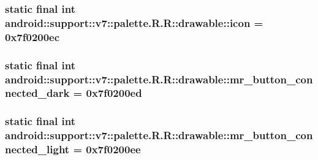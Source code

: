 \hypertarget{classandroid_1_1support_1_1v7_1_1palette_1_1_r_1_1drawable_890458ca42f2f744b6dbf29ebc882c73}{
\subsubsection[{icon}]{\setlength{\rightskip}{0pt plus 5cm}static final int android::support::v7::palette.R.R::drawable::icon = 0x7f0200ec}}
\label{classandroid_1_1support_1_1v7_1_1palette_1_1_r_1_1drawable_890458ca42f2f744b6dbf29ebc882c73}


\hypertarget{classandroid_1_1support_1_1v7_1_1palette_1_1_r_1_1drawable_00cded799af201976188bba8c1bc1765}{
\subsubsection[{mr\_\-button\_\-connected\_\-dark}]{\setlength{\rightskip}{0pt plus 5cm}static final int android::support::v7::palette.R.R::drawable::mr\_\-button\_\-connected\_\-dark = 0x7f0200ed}}
\label{classandroid_1_1support_1_1v7_1_1palette_1_1_r_1_1drawable_00cded799af201976188bba8c1bc1765}


\hypertarget{classandroid_1_1support_1_1v7_1_1palette_1_1_r_1_1drawable_e7dc655c3e1d3de8f872b28a5e97e0cb}{
\subsubsection[{mr\_\-button\_\-connected\_\-light}]{\setlength{\rightskip}{0pt plus 5cm}static final int android::support::v7::palette.R.R::drawable::mr\_\-button\_\-connected\_\-light = 0x7f0200ee}}
\label{classandroid_1_1support_1_1v7_1_1palette_1_1_r_1_1drawable_e7dc655c3e1d3de8f872b28a5e97e0cb}


